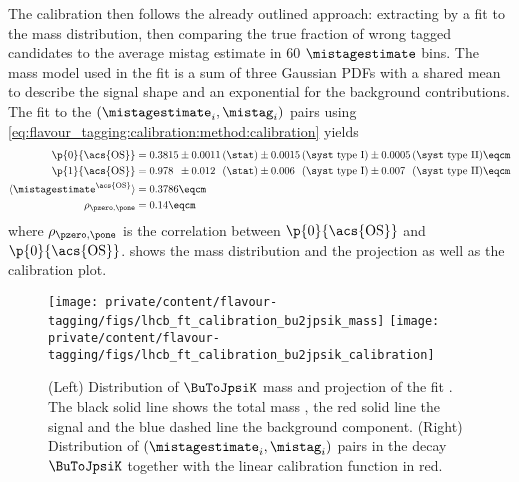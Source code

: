 The calibration then follows the already outlined approach: extracting \sweights
by a fit to the \Bu mass distribution, then comparing the true fraction of wrong
tagged candidates to the average mistag estimate in $\num{60}$ $\mistagestimate$
bins. The mass model used in the fit is a sum of three Gaussian \acp{PDF} with a
shared mean to describe the signal shape and an exponential \PDF for the
background contributions. The fit to the $(\mistagestimate_i,\mistag_i)$ pairs
using \cref{eq:flavour_tagging:calibration:method:calibration} yields
%
\begin{equation}\label{eq:flavour_tagging:calibration:os:parameters}
  \begin{split}
    \p{0}{\text{\acs{OS}}} &= 0.3815 \pm 0.0011 \text{\,(\stat)} 
                               \pm 0.0015 \text{\,(\syst type I)}  
                               \pm 0.0005 \text{\,(\syst type II)} \eqcm\\ %
    \p{1}{\text{\acs{OS}}} &= 0.978\phantom{0} \pm 0.012\phantom{0} \text{\,(\stat)} 
                                         \pm 0.006\phantom{0}  \text{\,(\syst type I)} 
                                         \pm 0.007\phantom{0}  \text{\,(\syst type II)} \eqcm\\ %
    \langle\mistagestimate^{\text{\acs{OS}}}\rangle &= 0.3786 \eqcm \\
    \rho_{\pzero,\pone} &= 0.14 \eqcm
  \end{split}
\end{equation}
%
where $\rho_{\pzero,\pone}$ is the correlation between $\p{0}{\text{\acs{OS}}}$ and
$\p{0}{\text{\acs{OS}}}$. 
shows the mass distribution and the \PDF projection as well as the calibration
plot.
%
\begin{figure}
  \centering
  \texttt{[image: private/content/flavour-tagging/figs/lhcb\_ft\_calibration\_bu2jpsik\_mass]}
  \texttt{[image: private/content/flavour-tagging/figs/lhcb\_ft\_calibration\_bu2jpsik\_calibration]}
  \caption{(Left) Distribution of $\BuToJpsiK$ mass and projection of the fit \PDF.
  The black solid line shows the total mass \PDF, the red solid line the signal
  and the blue dashed line the background component. (Right) Distribution of
  $(\mistagestimate_i,\mistag_i)$ pairs in the decay $\BuToJpsiK$ together with
  the linear calibration function in red. \cite{FT:RunI}}
  \label{fig:flavour_tagging:calibration:os:mass_and_calibration}
\end{figure}
